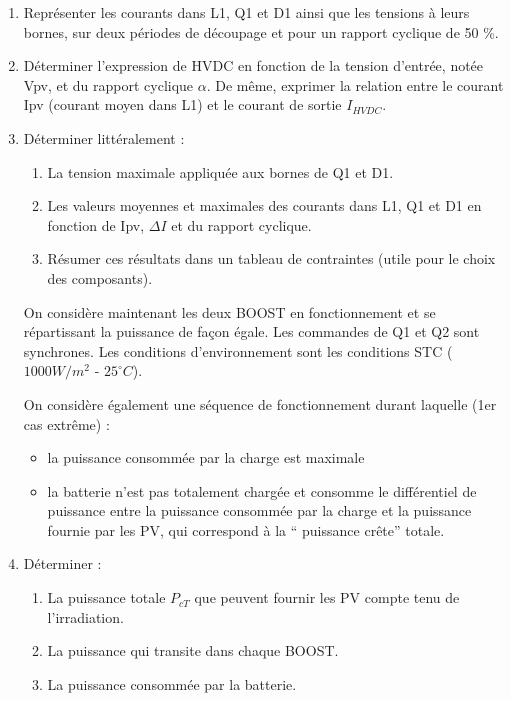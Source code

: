 \begin{enumerate}
\item Représenter les courants dans L1, Q1 et D1 ainsi que les tensions à leurs bornes, sur deux périodes de découpage et pour un rapport cyclique de 50 \%.

\item Déterminer l’expression de HVDC en fonction de la tension d’entrée, notée Vpv, et du rapport cyclique $\alpha$.
De même, exprimer la relation entre le courant Ipv (courant moyen dans L1) et le courant de sortie $I_{HVDC}$.

\item Déterminer littéralement :
\begin{enumerate}
\item La tension maximale appliquée aux bornes de Q1 et D1.
\item Les valeurs moyennes et maximales des courants dans L1, Q1 et D1 en fonction de Ipv, $\Delta I$ et du rapport cyclique.
\item Résumer ces résultats dans un tableau de contraintes (utile pour le choix des composants).
\end{enumerate}

On considère maintenant les deux BOOST en fonctionnement et se répartissant la puissance de façon égale. Les commandes de Q1 et Q2 sont synchrones.
Les conditions d’environnement sont les conditions STC ($1000 W/m^2$ - $25^\circ C$).

On considère également une séquence de fonctionnement durant laquelle (1er cas extrême) :
\begin{itemize}
\item la puissance consommée par la charge est maximale
\item la batterie n’est pas totalement chargée et consomme le différentiel de puissance entre la puissance consommée par la charge et la puissance fournie par les PV, qui correspond à la `` puissance crête'' totale.
\end{itemize}

\item Déterminer :
\begin{enumerate}
\item La puissance totale $P_{cT}$ que peuvent fournir les PV compte tenu de l’irradiation.
\item La puissance qui transite dans chaque BOOST.
\item La puissance consommée par la batterie.
\end{enumerate}


\end{enumerate}
